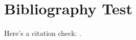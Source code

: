\documentclass{article}
\begin{document}
\section*{Bibliography Test}

Here’s a citation check: \citep{hicken_building_2009}.

\nocite{*}


\end{document}
